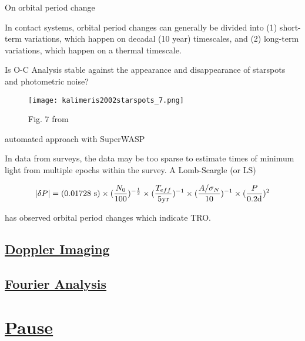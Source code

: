 \documentclass[12pt]{article} %
\numberwithin{equation}{section} %
\begin{document}
On orbital period change \citep{kalimeris1994orbital}

In contact systems, orbital period changes can generally be divided into (1) short-term variations, which happen on decadal (10 year) timescales, and (2) long-term variations, which happen on a thermal timescale.

Is O-C Analysis stable against the appearance and disappearance of starspots and photometric noise? \citep{kalimeris2002starspots}

\begin{figure}[H]
\centering
\texttt{[image: kalimeris2002starspots\_7.png]}
\caption{ Fig. 7 from \citet{kalimeris2002starspots}}
\label{fig: kalimeris2002starspots_7}
\end{figure}

automated approach with SuperWASP \citep{lohr2015orbital}

In data from surveys, the data may be too sparse to estimate times of minimum light from multiple epochs within the survey. A Lomb-Scargle (or LS) \citep{scargle1982studies}

\citep{horne1986prescription} 

\begin{equation} \label{eqn: horne_baliunas}
|\delta P| = (0.01728\text{ s}) \times (\frac{N_{0}}{100})^{-\frac{1}{2}} \times (\frac{T_{eff}}{5\text{yr}})^{-1} \\  \times (\frac{A/ \sigma_{N}}{10})^{-1} \times (\frac{P}{0.2\text{d}})^{2}
\end{equation}


\citet{qian2001orbital} has observed orbital period changes which indicate TRO. 

\subsection[Doppler Imaging]{\hyperlink{toc}{Doppler Imaging}} \label{sec: doppler_imaging}

\subsection[Fourier Analysis]{\hyperlink{toc}{Fourier Analysis}} \label{sec: fourier_analysis}

\section[Pause]{\hyperlink{toc}{Pause}} \label{sec: pause}
\end{document}
